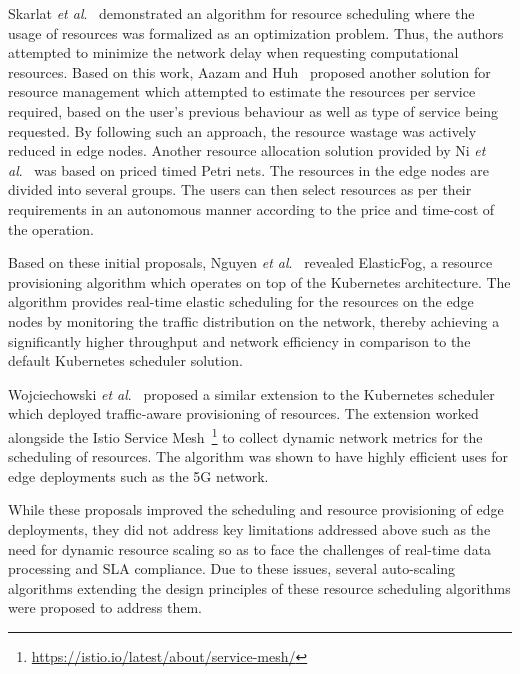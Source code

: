 Skarlat \textit{et al}.~\cite{skarlat2016resource} demonstrated an algorithm for resource scheduling where the usage of resources was formalized as an optimization problem. Thus, the authors attempted to minimize the network delay when requesting computational resources. Based on this work, Aazam and Huh~\cite{aazam2015dynamic} proposed another solution for resource management which attempted to estimate the resources per service required, based on the user's previous behaviour as well as type of service being requested. By following such an approach, the resource wastage was actively reduced in edge nodes. Another resource allocation solution provided by Ni \textit{et al}.~\cite{ni2017resource} was based on priced timed Petri nets. The resources in the edge nodes are divided into several groups. The users can then select resources as per their requirements in an autonomous manner according to the price and time-cost of the operation.\par

Based on these initial proposals, Nguyen \textit{et al}.~\cite{nguyen2020elasticfog} revealed ElasticFog, a resource provisioning algorithm which operates on top of the Kubernetes architecture. The algorithm provides real-time elastic scheduling for the resources on the edge nodes by monitoring the traffic distribution on the network, thereby achieving a significantly higher throughput and network efficiency in comparison to the default Kubernetes scheduler solution.\par

Wojciechowski \textit{et al}.~\cite{wojciechowski2021netmarks} proposed a similar extension to the Kubernetes scheduler which deployed traffic-aware provisioning of resources. The extension worked alongside the Istio Service Mesh~\footnote{\url{https://istio.io/latest/about/service-mesh/}} to collect dynamic network metrics for the scheduling of resources. The algorithm was shown to have highly efficient uses for edge deployments such as the 5G network.\par

While these proposals improved the scheduling and resource provisioning of edge deployments, they did not address key limitations addressed above such as the need for dynamic resource scaling so as to face the challenges of real-time data processing and SLA compliance. Due to these issues, several auto-scaling algorithms extending the design principles of these resource scheduling algorithms were proposed to address them.

